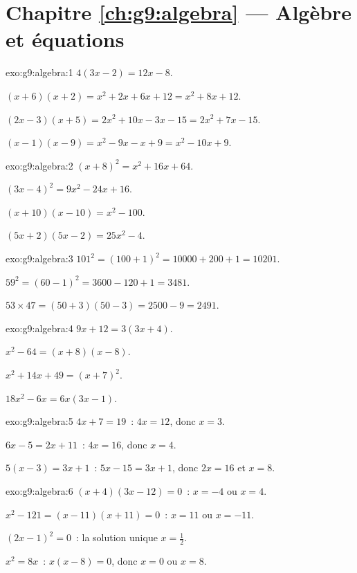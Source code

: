 \section*{Chapitre \ref{ch:g9:algebra} --- Algèbre et équations}

\begin{solution}{exo:g9:algebra:1}
$4(3x - 2) = 12x - 8$.

$(x+6)(x+2) = x^2 + 2x + 6x + 12 = x^2 + 8x + 12$.

$(2x-3)(x+5) = 2x^2 + 10x - 3x - 15 = 2x^2 + 7x - 15$.

$(x-1)(x-9) = x^2 - 9x - x + 9 = x^2 - 10x + 9$.
\end{solution}

\begin{solution}{exo:g9:algebra:2}
$(x+8)^2 = x^2 + 16x + 64$.

$(3x-4)^2 = 9x^2 - 24x + 16$.

$(x+10)(x-10) = x^2 - 100$.

$(5x+2)(5x-2) = 25x^2 - 4$.
\end{solution}

\begin{solution}{exo:g9:algebra:3}
$101^2 = (100+1)^2 = 10000 + 200 + 1 = 10201$.

$59^2 = (60-1)^2 = 3600 - 120 + 1 = 3481$.

$53 \times 47 = (50+3)(50-3) = 2500 - 9 = 2491$.
\end{solution}

\begin{solution}{exo:g9:algebra:4}
$9x + 12 = 3(3x + 4)$.

$x^2 - 64 = (x+8)(x-8)$.

$x^2 + 14x + 49 = (x+7)^2$.

$18x^2 - 6x = 6x(3x - 1)$.
\end{solution}

\begin{solution}{exo:g9:algebra:5}
$4x + 7 = 19$~: $4x = 12$, donc $x = 3$.

$6x - 5 = 2x + 11$~: $4x = 16$, donc $x = 4$.

$5(x-3) = 3x + 1$~: $5x - 15 = 3x + 1$, donc $2x = 16$ et $x = 8$.
\end{solution}

\begin{solution}{exo:g9:algebra:6}
$(x+4)(3x-12) = 0$~: $x = -4$ ou $x = 4$.

$x^2 - 121 = (x-11)(x+11) = 0$~: $x = 11$ ou $x = -11$.

$(2x-1)^2 = 0$~: la solution unique $x = \frac12$.

$x^2 = 8x$~: $x(x - 8) = 0$, donc $x = 0$ ou $x = 8$.
\end{solution}

